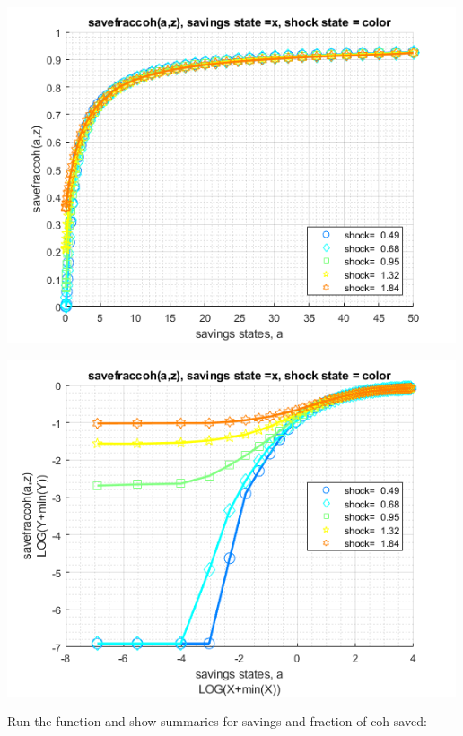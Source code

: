 \documentclass[
]{book}
\begin{document}
\includegraphics[width=5.20833in,height=\textheight]{img/fx_vfi_az_bisec_vec_images/figure_0.png}

\includegraphics[width=5.20833in,height=\textheight]{img/fx_vfi_az_bisec_vec_images/figure_1.png}

Run the function and show summaries for savings and fraction of coh
saved:
\end{document}
